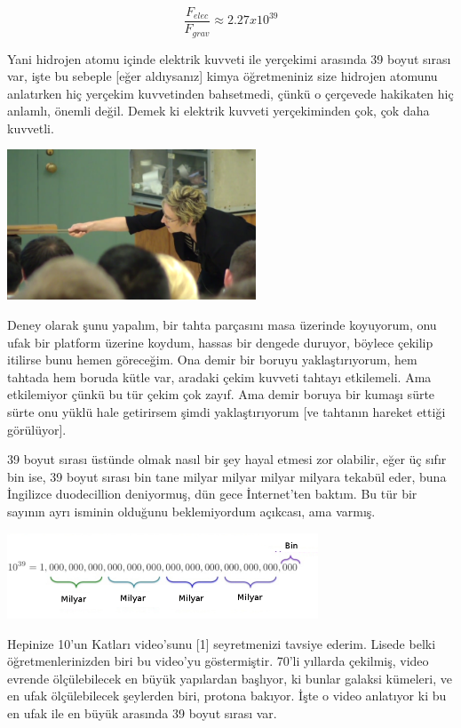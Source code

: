 \documentclass[12pt,fleqn]{article}\usepackage{../../common}
\begin{document}
$$ \frac{F_{elec}}{F_{grav}} \approx 2.27 x 10^{39}$$

Yani hidrojen atomu içinde elektrik kuvveti ile yerçekimi arasında 39 boyut
sırası var, işte bu sebeple [eğer aldıysanız] kimya öğretmeniniz size hidrojen
atomunu anlatırken hiç yerçekim kuvvetinden bahsetmedi, çünkü o çerçevede
hakikaten hiç anlamlı, önemli değil. Demek ki elektrik kuvveti yerçekiminden
çok, çok daha kuvvetli.

\includegraphics[width=20em]{02_03.png}

Deney olarak şunu yapalım, bir tahta parçasını masa üzerinde koyuyorum, onu
ufak bir platform üzerine koydum, hassas bir dengede duruyor, böylece
çekilip itilirse bunu hemen göreceğim.  Ona demir bir boruyu
yaklaştırıyorum, hem tahtada hem boruda kütle var, aradaki çekim kuvveti
tahtayı etkilemeli. Ama etkilemiyor çünkü bu tür çekim çok zayıf. Ama demir
boruya bir kumaşı sürte sürte onu yüklü hale getirirsem şimdi
yaklaştırıyorum [ve tahtanın hareket ettiği görülüyor].

39 boyut sırası üstünde olmak nasıl bir şey hayal etmesi zor olabilir, eğer
üç sıfır bin ise, 39 boyut sırası bin tane milyar milyar milyar milyara
tekabül eder, buna İngilizce duodecillion deniyormuş, dün gece İnternet'ten
baktım. Bu tür bir sayının ayrı isminin olduğunu beklemiyordum açıkcası,
ama varmış.

\includegraphics[width=25em]{02_04.png}

Hepinize 10'un Katları video'sunu [1] seyretmenizi tavsiye ederim. Lisede
belki öğretmenlerinizden biri bu video'yu göstermiştir. 70'li yıllarda
çekilmiş, video evrende ölçülebilecek en büyük yapılardan başlıyor, ki
bunlar galaksi kümeleri, ve en ufak ölçülebilecek şeylerden biri, protona
bakıyor. İşte o video anlatıyor ki bu en ufak ile en büyük arasında 39
boyut sırası var.
\end{document}
